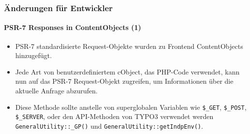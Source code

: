 %

\begin{frame}[fragile]
	\frametitle{Änderungen für Entwickler}
	\framesubtitle{PSR-7 Responses in ContentObjects (1)}

	\begin{itemize}
		\item PSR-7 standardisierte Request-Objekte wurden zu Frontend ContentObjects hinzugefügt.
		\item Jede Art von benutzerdefiniertem cObject, das PHP-Code verwendet, kann nun
			auf das PSR-7 Request-Objekt zugreifen, um Informationen über die aktuelle Anfrage abzurufen.
		\item Diese Methode sollte anstelle von superglobalen Variablen wie \newline
			\smaller\texttt{\$\_GET}, \texttt{\$\_POST}, \texttt{\$\_SERVER},\normalsize
			oder den API-Methoden von TYPO3 verwendet werden\newline
			\smaller\texttt{GeneralUtility::\_GP()}\normalsize
			und
			\smaller\texttt{GeneralUtility::getIndpEnv()}\normalsize.

	\end{itemize}
\end{frame}


